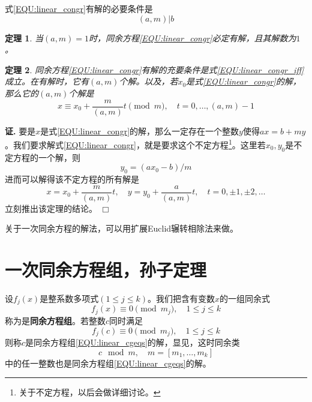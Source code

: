 \documentclass{ctexrep}
\newcommand{\bbold}[1]{\textbf{#1}}
\newtheorem{thrm}{定理}[section]
\renewenvironment{proof}[1][证]{\noindent \textbf{#1.} }{\hfill$\Box$}
\begin{document}
式\ref{EQU:linear_congr}有解的必要条件是
\begin{equation}\label{EQU:linear_congr_iff}
(a,m)|b
\end{equation}

\begin{thrm}
当$(a,m)=1$时，同余方程\ref{EQU:linear_congr}必定有解，且其解数为$1$。
\end{thrm}

\begin{thrm}
同余方程\ref{EQU:linear_congr}有解的充要条件是式\ref{EQU:linear_congr_iff}成立。在有解时，它有$(a,m)$个解。以及，若$x_0$是式\ref{EQU:linear_congr}的解，那么它的$(a,m)$个解是
\begin{displaymath}
x\equiv x_0+\frac{m}{(a,m)}t\pmod{m},\quad t=0,\dotsc,(a,m)-1
\end{displaymath}
\end{thrm}
\begin{proof}
要是$x$是式\ref{EQU:linear_congr}的解，那么一定存在一个整数$y$使得$ax=b+my$。我们要求解式\ref{EQU:linear_congr}，就是要求这个不定方程\footnote{关于不定方程，以后会做详细讨论。}。这里若$x_0,y_0$是不定方程的一个解，则
\begin{displaymath}
y_0=(ax_0-b)/m
\end{displaymath}
进而可以解得该不定方程的所有解是
\begin{displaymath}
x=x_0+\frac{m}{(a,m)}t,\quad y=y_0+\frac{a}{(a,m)}t,\quad t=0,\pm 1,\pm 2,\dotsc
\end{displaymath}
立刻推出该定理的结论。
\end{proof}

关于一次同余方程的解法，可以用扩展Euclid辗转相除法来做。

\section{一次同余方程组，孙子定理}
设$f_j(x)$是整系数多项式$(1\leq j\leq k)$。我们把含有变数$x$的一组同余式
\begin{equation}\label{EQU:linear_cgeqs}
f_j(x)\equiv 0\pmod{m_j},\quad 1\leq j\leq k
\end{equation}
称为是\bbold{同余方程组}。若整数$c$同时满足
\begin{equation}
f_j(c)\equiv 0\pmod{m_j},\quad 1\leq j\leq k
\end{equation}
则称$c$是同余方程组\ref{EQU:linear_cgeqs}的解，显见，这时同余类
\begin{displaymath}
c\mod m,\quad m=[m_1,\dotsc,m_k]
\end{displaymath}
中的任一整数也是同余方程组\ref{EQU:linear_cgeqs}的解。
\end{document}
